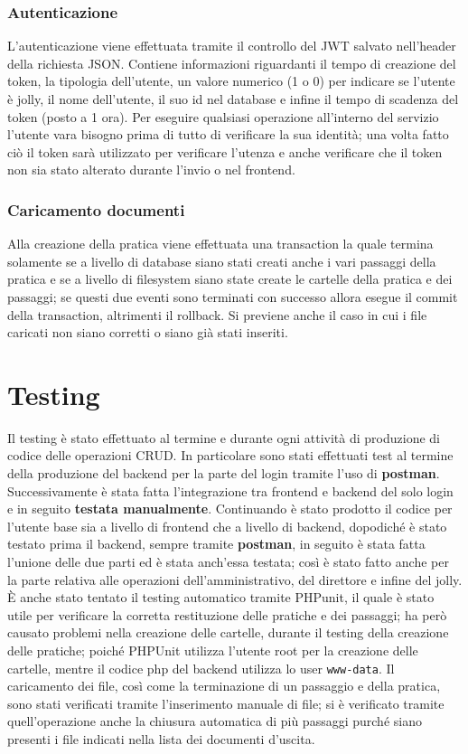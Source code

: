 \documentclass{article}
\begin{document}
\subsubsection{Autenticazione}
L'autenticazione viene effettuata tramite il controllo del JWT salvato nell'header della richiesta JSON. Contiene informazioni riguardanti il tempo di creazione del token, la tipologia dell'utente, un valore numerico (1 o 0) per indicare se l'utente è jolly, il nome dell'utente, il suo id nel database e infine il tempo di scadenza del token (posto a 1 ora). Per eseguire qualsiasi operazione all'interno del servizio l'utente vara bisogno prima di tutto di verificare la sua identità; una volta fatto ciò il token sarà utilizzato per verificare l'utenza e anche verificare che il token non sia stato alterato durante l'invio o nel frontend.
\subsubsection{Caricamento documenti}
Alla creazione della pratica viene effettuata una transaction la quale termina solamente se a livello di database siano stati creati anche i vari passaggi della pratica e se a livello di filesystem siano state create le cartelle della pratica e dei passaggi; se questi due eventi sono terminati con successo allora esegue il commit della transaction, altrimenti il rollback.
Si previene anche il caso in cui i file caricati non siano corretti o siano già stati inseriti.
\section{Testing}
Il testing è stato effettuato al termine e durante ogni attività di produzione di codice delle operazioni CRUD. In particolare sono stati effettuati test al termine della produzione del backend per la parte del login tramite l'uso di \textbf{postman}.\\
Successivamente è stata fatta l'integrazione tra frontend e backend del solo login e in seguito \textbf{testata manualmente}. Continuando è stato prodotto il codice per l'utente base sia a livello di frontend che a livello di backend, dopodiché è stato testato prima il backend, sempre tramite \textbf{postman}, in seguito è stata fatta l'unione delle due parti ed è stata anch'essa testata; così è stato fatto anche per la parte relativa alle operazioni dell'amministrativo, del direttore e infine del jolly.\\
È anche stato tentato il testing automatico tramite PHPunit, il quale è stato utile per verificare la corretta restituzione delle pratiche e dei passaggi; ha però causato problemi nella creazione delle cartelle, durante il testing della creazione delle pratiche; poiché PHPUnit utilizza l'utente root per la creazione delle cartelle, mentre il codice php del backend utilizza lo user \texttt{www-data}.
Il caricamento dei file, così come la terminazione di un passaggio e della pratica, sono stati verificati tramite l'inserimento manuale di file; si è verificato tramite quell'operazione anche la chiusura automatica di più passaggi purché siano presenti i file indicati nella lista dei documenti d'uscita.
\end{document}
